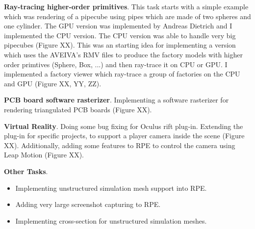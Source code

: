 \documentclass[]{report}
\begin{document}
\textbf{Ray-tracing higher-order primitives}. This task starts with a simple example which was rendering of a pipecube using pipes which are made of two spheres and one cylinder. The GPU version was implemented by Andreas Dietrich and I implemented the CPU version. The CPU version was able to handle very big pipecubes (Figure XX). This was an starting idea for implementing a version which uses the AVEIVA's RMV files to produce the factory models with higher order primtives (Sphere, Box, ...) and then ray-trace it on CPU or GPU. I implemented a factory viewer which ray-trace a group of factories on the CPU and GPU (Figure XX, YY, ZZ).

\textbf{PCB board software rasterizer}. Implementing a software rasterizer for rendering triangulated PCB boards (Figure XX).

\textbf{Virtual Reality}. Doing some bug fixing for Oculus rift plug-in. Extending the plug-in for specific projects, to support a player camera inside the scene (Figure XX). Additionally, adding some features to RPE to control the camera using Leap Motion (Figure XX).

\textbf{Other Tasks}.
\begin{itemize}
	\item Implementing unstructured simulation mesh support into RPE.
	\item Adding very large screenshot capturing to RPE.
	\item Implementing cross-section for unstructured simulation meshes.
\end{itemize}
 
\end{document}
